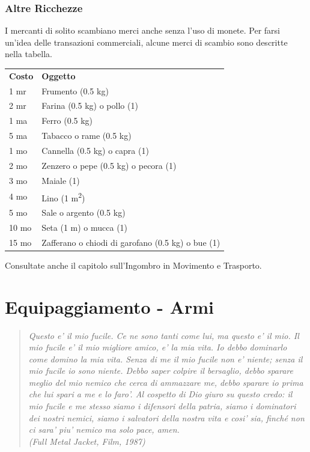 \documentclass[a4paper,11pt,twoside,openany]{book}
\begin{document}
{\bigskip

\subsubsection{Altre Ricchezze}

I mercanti di solito scambiano merci anche senza l'uso di monete.
Per farsi un'idea delle transazioni commerciali, alcune merci di scambio sono descritte nella tabella.

\bigskip

\begin{tabular}{ll}
\toprule
\textbf{Costo} & \textbf{Oggetto}\tabularnewline
1 mr & Frumento (0.5 kg)\tabularnewline
2 mr & Farina (0.5 kg) o pollo (1)\tabularnewline
1 ma & Ferro (0.5 kg)\tabularnewline
5 ma & Tabacco o rame (0.5 kg)\tabularnewline
1 mo & Cannella (0.5 kg) o capra (1)\tabularnewline
2 mo & Zenzero o pepe (0.5 kg) o pecora (1)\tabularnewline
3 mo & Maiale (1)\tabularnewline
4 mo & Lino (1 m\textsuperscript{2})\tabularnewline
5 mo & Sale o argento (0.5 kg)\tabularnewline
10 mo & Seta (1 m) o mucca (1)\tabularnewline
15 mo & Zafferano o chiodi di garofano (0.5 kg) o bue (1)\tabularnewline
\end{tabular}

Consultate anche il capitolo sull'Ingombro in Movimento e Trasporto.

\pagebreak

\section{Equipaggiamento - Armi}

\label{equipaggiamento---armi}
\begin{quote}\textit{
Questo e' il mio fucile. Ce ne sono tanti come lui, ma questo e' il mio. Il mio fucile e' il mio migliore amico, e' la mia vita. Io debbo dominarlo come domino la mia vita. Senza di me il mio fucile non e' niente; senza il mio fucile io sono niente. Debbo saper colpire il bersaglio, debbo sparare meglio del mio nemico che cerca di ammazzare me, debbo sparare io prima che lui spari a me e lo faro'. Al cospetto di Dio giuro su questo credo: il mio fucile e me stesso siamo i difensori della patria, siamo i dominatori dei nostri nemici, siamo i salvatori della nostra vita e cosi' sia, finché non ci sara' piu' nemico ma solo pace, amen.
\\
(Full Metal Jacket, Film, 1987)
}\end{quote}

}
\end{document}
